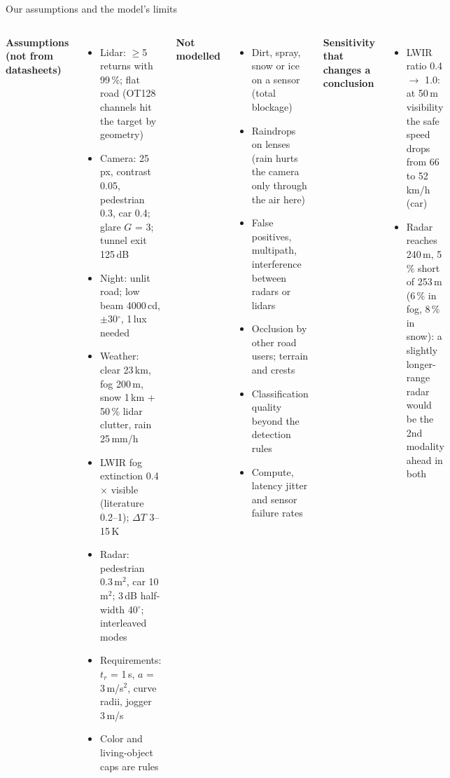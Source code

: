 \documentclass[aspectratio=169,11pt]{beamer}
\begin{document}
\begin{frame}{Our assumptions and the model's limits}
  \scriptsize
  \begin{columns}[t]
    \textbf{Assumptions (not from datasheets)}
    \begin{itemize}
      \item Lidar: $\ge$5 returns with 99\,\%; flat road (OT128 channels hit the target by geometry)
      \item Camera: 25\,px, contrast 0.05, pedestrian 0.3, car 0.4; glare $G$ = 3; tunnel exit 125\,dB
      \item Night: unlit road; low beam 4000\,cd, $\pm$30$^\circ$, 1\,lux needed
      \item Weather: clear 23\,km, fog 200\,m, snow 1\,km + 50\,\% lidar clutter, rain 25\,mm/h
      \item LWIR fog extinction 0.4\,$\times$ visible (literature 0.2--1); $\Delta T$ 3--15\,K
      \item Radar: pedestrian 0.3\,m$^2$, car 10\,m$^2$; 3\,dB half-width 40$^\circ$; interleaved modes
      \item Requirements: $t_r$ = 1\,s, $a$ = 3\,m/s$^2$, curve radii, jogger 3\,m/s
      \item Color and living-object caps are rules
    \end{itemize}
    \textbf{Not modelled}
    \begin{itemize}
      \item Dirt, spray, snow or ice on a sensor (total blockage)
      \item Raindrops on lenses (rain hurts the camera only through the air here)
      \item False positives, multipath, interference between radars or lidars
      \item Occlusion by other road users; terrain and crests
      \item Classification quality beyond the detection rules
      \item Compute, latency jitter and sensor failure rates
    \end{itemize}
    \vspace{0.4em}
    \textbf{Sensitivity that changes a conclusion}
    \begin{itemize}
      \item LWIR ratio 0.4 $\to$ 1.0: at 50\,m visibility the safe speed drops from 66 to 52\,km/h (car)
      \item Radar reaches 240\,m, 5\,\% short of 253\,m (6\,\% in fog, 8\,\% in snow): a slightly longer-range
        radar would be the 2nd modality ahead in both
    \end{itemize}
  \end{columns}
\end{frame}
\end{document}
